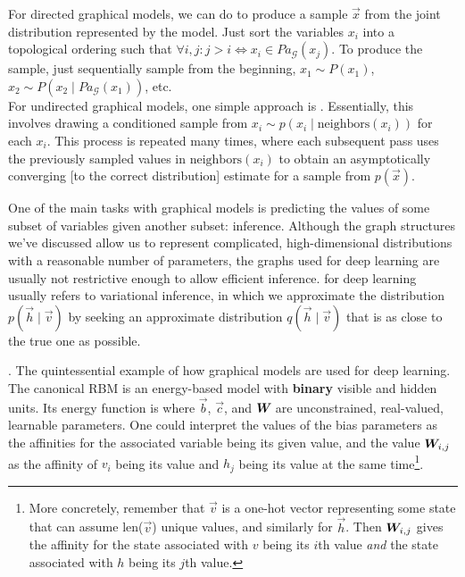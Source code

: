 \documentclass[11pt]{article}
\begin{document}
\myspace{}
\myspace

\p For directed graphical models, we can do  to produce a sample $\vec{x}$ from the joint distribution represented by the model. Just sort the variables $x_i$ into a topological ordering such that $\forall i,j: j > i \iff x_i \in Pa_{\mathcal{G}}(x_j)$. To produce the sample, just sequentially sample from the beginning, $x_1 \sim P(x_1)$, $x_2 \sim P(x_2 \mid Pa_{\mathcal{G}}(x_1) )$, etc.\\

\p For undirected graphical models, one simple approach is . Essentially, this involves drawing a conditioned sample from $x_i \sim p(x_i \mid \text{neighbors}(x_i))$ for each $x_i$. This process is repeated many times, where each subsequent pass uses the previously sampled values in $\text{neighbors}(x_i)$ to obtain an asymptotically converging [to the correct distribution] estimate for a sample from $p(\vec{x})$.

\myspace{}
\myspace

\p One of the main tasks with graphical models is predicting the values of some subset of variables given another subset: inference. Although the graph structures we've discussed allow us to represent complicated, high-dimensional distributions with a reasonable number of parameters, the graphs used for deep learning are usually not restrictive enough to allow efficient inference.  for deep learning usually refers to variational inference, in which we approximate the distribution $p(\vec{h} \mid \vec{v})$ by seeking an approximate distribution $q(\vec{h} \mid \vec{v})$ that is as close to the true one as possible. 

\myspace
\p {}. The quintessential example of how graphical models are used for deep learning. The canonical RBM is an energy-based model with \textbf{binary} visible and hidden units. Its energy function is
where $\vec{b}$, $\vec{c}$, and $\matr{W}$ are unconstrained, real-valued, learnable parameters. One could interpret the values of the bias parameters as the affinities for the associated variable being its given value, and the value $\matr[i,j]{W}$ as the affinity of $v_i$ being its value and $h_j$ being its value at the same time\footnote{More concretely, remember that $\vec{v}$ is a one-hot vector representing some state that can assume len($\vec{v}$) unique values, and similarly for $\vec{h}$. Then $\matr[i,j]{W}$ gives the affinity for the state associated with $v$ being its $i$th value \textit{and} the state associated with $h$ being its $j$th value.}. \\
\end{document}
